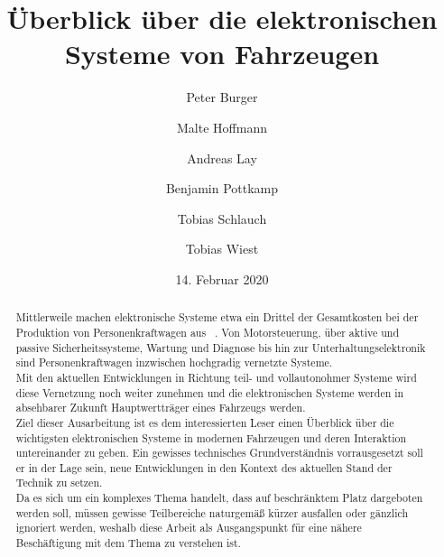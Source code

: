 \documentclass[]{article}
\title{Überblick über die elektronischen Systeme von Fahrzeugen}
\author{
	Peter Burger
	\and
	Malte Hoffmann
	\and
	Andreas Lay
	\and
	Benjamin Pottkamp
	\and
	Tobias Schlauch
	\and
	Tobias Wiest
}
\date{14. Februar 2020}
\begin{document}
\maketitle

\begin{abstract}
	Mittlerweile machen elektronische Systeme etwa ein Drittel der Gesamtkosten bei der Produktion von
	Personenkraftwagen aus ~\cite{.BP02}. Von Motorsteuerung, über aktive und passive Sicherheitssysteme, 
	Wartung und Diagnose bis hin zur Unterhaltungselektronik sind Personenkraftwagen inzwischen hochgradig
	vernetzte Systeme.\\
	
	Mit den aktuellen Entwicklungen in Richtung teil- und vollautonohmer Systeme wird diese Vernetzung noch weiter zunehmen 
	und die elektronischen Systeme werden in absehbarer Zukunft Hauptwertträger eines Fahrzeugs werden.\\
	
	Ziel dieser Ausarbeitung ist es dem interessierten Leser einen Überblick über die wichtigsten elektronischen Systeme in
	modernen Fahrzeugen und deren Interaktion untereinander zu geben. Ein gewisses technisches Grundverständnis vorrausgesetzt 
	soll er in der Lage sein, neue Entwicklungen in den Kontext des aktuellen Stand der Technik zu setzen.\\
	
	Da es sich um ein komplexes Thema handelt, dass auf beschränktem Platz dargeboten werden soll, müssen gewisse Teilbereiche naturgemäß
	kürzer ausfallen oder gänzlich ignoriert werden, weshalb diese Arbeit als Ausgangspunkt für eine nähere Beschäftigung mit dem Thema
	zu verstehen ist.
\end{abstract}

\newpage
\tableofcontents











\end{document}
